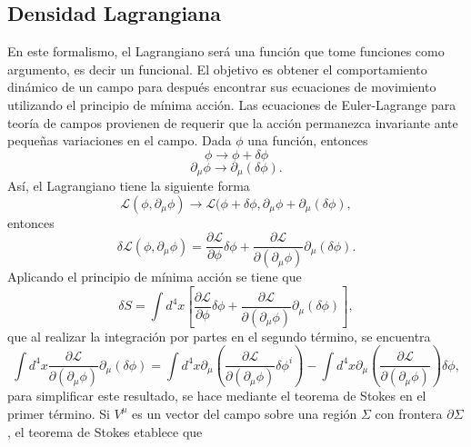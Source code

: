 \documentclass[a4paper,openright,10pt, oneside, final]{book}
\begin{document}
\subsection*{Densidad Lagrangiana}
En este formalismo, el Lagrangiano será una función que tome funciones como argumento, es decir un funcional. El objetivo es obtener el comportamiento dinámico de un campo para después encontrar sus ecuaciones de movimiento utilizando el principio de mínima acción. Las ecuaciones de Euler-Lagrange para teoría de campos provienen de requerir que la acción permanezca invariante ante pequeñas variaciones en el campo. Dada $\phi$ una función, entonces
\begin{equation}
\phi \rightarrow \phi + \delta\phi\label{A3}
\end{equation}
\begin{equation}
\partial_{\mu}\phi \rightarrow \partial_{\mu}(\delta\phi).\label{A4}
\end{equation}
Así, el Lagrangiano tiene la siguiente forma
\begin{equation}
\mathcal{L}(\phi,\partial_{\mu}\phi) \rightarrow \mathcal{L}(\phi + \delta\phi, \partial_{\mu}\phi + \partial_{\mu}(\delta\phi),\label{A5}
\end{equation}
entonces
\begin{equation}
\delta \mathcal{L}(\phi,\partial_{\mu}\phi) = \frac{\partial \mathcal{L}}{\partial \phi}\delta\phi + \frac{\partial \mathcal{L}}{\partial(\partial_{\mu}\phi)}\partial_{\mu}(\delta\phi).\label{A6}
\end{equation}
Aplicando el principio de mínima acción se tiene que
\begin{equation}
\delta S = \int d^{4}x \left[\frac{\partial \mathcal{L}}{\partial \phi}\delta\phi + \frac{\partial \mathcal{L}}{\partial(\partial_{\mu}\phi)}\partial_{\mu}(\delta\phi)\right],\label{A7}
\end{equation}
que al realizar la integración por partes en el segundo término, se encuentra
\begin{equation}
\int d^{4}x \frac{\partial \mathcal{L}}{\partial(\partial_{\mu}\phi)}\partial_{\mu}(\delta\phi)
 = 
 \int d^{4}x\partial_{\mu}\left(\frac{\partial\mathcal{L}}{\partial(\partial_{\mu}\phi)}\delta\phi^{i}\right)
 -
 \int d^{4}x\partial_{\mu}\left(\frac{\partial\mathcal{L}}{\partial(\partial_{\mu}\phi)}\right)\delta\phi,\label{A8}
\end{equation}
para simplificar este resultado, se hace mediante el teorema de Stokes en el primer término. Si $V^{\mu}$ es un vector del campo sobre una región $\Sigma$ con frontera $\partial\Sigma$, el teorema de Stokes etablece que 
\end{document}
